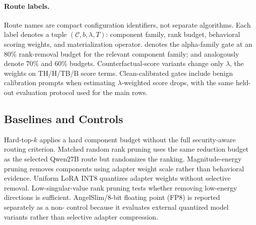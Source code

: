 \paragraph{Route labels.}
Route names are compact configuration identifiers, not separate algorithms.
Each label denotes a tuple $(\mathcal{C}, b,\lambda,T)$: component family, rank budget, behavioral scoring weights, and materialization operator.
 denotes the alpha-family gate at an 80\% rank-removal budget for the relevant component family;  and  analogously denote 70\% and 60\% budgets.
Counterfactual-score variants change only $\lambda$, the weights on TH/H/TB/B score terms.
Clean-calibrated gates include benign calibration prompts when estimating $\lambda$-weighted score drops, with the same held-out evaluation protocol used for the main rows.

\subsection{Baselines and Controls}

Hard-top-$k$ applies a hard component budget without the full security-aware routing criterion.
Matched random rank pruning uses the same reduction budget as the selected Qwen27B route but randomizes the ranking.
Magnitude-energy pruning removes components using adapter weight scale rather than behavioral evidence.
Uniform LoRA INT8 quantizes adapter weights without selective removal.
Low-singular-value rank pruning tests whether removing low-energy directions is sufficient.
AngelSlim/8-bit floating point (FP8) is reported separately as a non-\sac{} control because it evaluates external quantized model variants rather than selective adapter compression.
